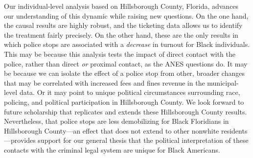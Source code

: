 \documentclass[
  12pt,
]{article}
\begin{document}
Our individual-level analysis based on Hillsborough County, Florida, advances our understanding of this dynamic while raising new questions. On the one hand, the causal results are highly robust, and the ticketing data allows us to identify the treatment fairly precisely. On the other hand, these are the only results in which police stops are associated with a \emph{decrease} in turnout for Black individuals. This may be because this analysis tests the impact of direct contact with the police, rather than direct \emph{or} proximal contact, as the ANES questions do. It may be because we can isolate the effect of a police stop from other, broader changes that may be correlated with increased fees and fines revenue in the municipal-level data. Or it may point to unique political circumstances surrounding race, policing, and political participation in Hillsborough County. We look forward to future scholarship that replicates and extends these Hillsborough County results. Nevertheless, that police stops are less demobilizing for Black Floridians in Hillsborough County---an effect that does not extend to other nonwhite residents---provides support for our general thesis that the political interpretation of these contacts with the criminal legal system are unique for Black Americans.
\end{document}
